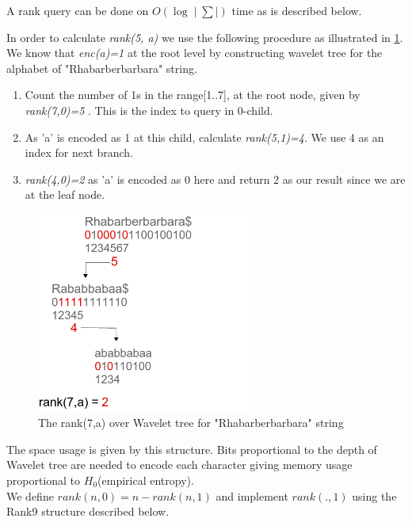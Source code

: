 \documentclass[11pt,a4paper]{report}
\begin{document}
A rank query can be done on  $O(\log{}\mid\sum\mid)$ time as is described below.

In order to calculate \emph{rank(5, a)} we use the following procedure
as illustrated in \ref{rank1}.\\
We know that \emph{enc(a)=1} at the root level by constructing wavelet
tree for the alphabet of  "Rhabarberbarbara" string.

\begin{enumerate}

    \item
		 Count the number of 1s in the range[1..7], at the root node, 
		 given by \emph{rank(7,0)=5 }. This is the index to query in 0-child.
		 
    \item
		As 'a' is encoded as 1 at this child, calculate \emph{rank(5,1)=4}. 
		We use 4 as an index for next branch.

    \item
		\emph{rank(4,0)=2} as 'a' is encoded as 0 here and return 2 as our
		 result since we are at the leaf node.

\end{enumerate}

\begin{figure}[H]
\centering
\includegraphics[width=7cm]{pictures/rank1.png}
\caption{The rank(7,a) over Wavelet tree for "Rhabarberbarbara" string }
\label{rank1}
\end{figure}

The space usage is given by this structure.
Bits proportional to the depth of  Wavelet tree are needed to encode
each character giving memory usage proportional to $H_{0}$(empirical entropy)\cite{entropy}.\\

We define \emph{$rank(n,0)= n- rank(n,1)$} and implement \emph{$rank(. , 1)$}
using the Rank9 structure described below.
\end{document}
